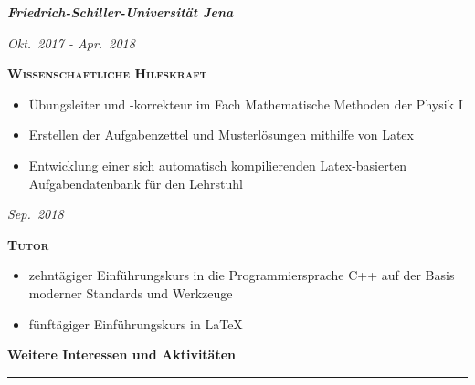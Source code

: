 \documentclass[8pt]{article}
\newcommand{\cvSectionStyle}{%
  \normalfont%
  \Large%
  \color{cvColor}%
  \bfseries%
  \sffamily%
}
\newcommand{\cvSubsectionStyle}{%
  \normalfont%
  \sffamily%
  \itshape%
  \bfseries%
}
\newcommand{\cvTimeStyle}{%
  \normalfont%
  \sffamily%
  \footnotesize%
  \itshape%
}
\newcommand{\cvSection}[1]{%
  \smallskip%
  {%
    \cvSectionStyle #1%
  }\\[-0.5em]
  \rule{\linewidth}{0.8pt}%
  \par%
  \smallskip%
}
\newcommand{\cvSubsection}[1]{%
  \begin{tcolorbox}[left=0pt, top=0pt, bottom=0pt, right=0pt, boxsep=5pt, arc=5pt, frame code={}, colback=cvBackgroundColor]
    \cvSubsectionStyle #1%
  \end{tcolorbox}
}
\newenvironment{cvTimeItem}[2]{
  \par
  \begin{minipage}[c]{0.15\linewidth}
    \raggedleft
    \cvTimeStyle #1
  \end{minipage}
  \quad
  \vrule
  \quad
  \begin{minipage}[t]{0.79\linewidth}
    \sffamily\textsc{\color{cvColor} \textbf{#2}}
    \begin{itemize}[itemsep=0mm, leftmargin=4mm]
      \normalfont\footnotesize\sffamily
}{
    \end{itemize}
  \end{minipage}
  \par%
  \vspace{\baselineskip}%
}
\begin{document}
  \cvSubsection{Friedrich-Schiller-Universität Jena}
  \begin{cvTimeItem}{Okt.~2017 - Apr.~2018}{Wissenschaftliche Hilfskraft}
    \item Übungsleiter und -korrekteur im Fach Mathematische Methoden der Physik I
    \item Erstellen der Aufgabenzettel und Musterlösungen mithilfe von Latex
    \item Entwicklung einer sich automatisch kompilierenden Latex-basierten Aufgabendatenbank für den Lehrstuhl
  \end{cvTimeItem}
  \begin{cvTimeItem}{Sep.~2018}{Tutor}
    \item zehntägiger Einführungskurs in die Programmiersprache C++ auf der Basis moderner Standards und Werkzeuge
    \item fünftägiger Einführungskurs in LaTeX
  \end{cvTimeItem}

  \cvSection{Weitere Interessen und Aktivitäten}
\end{document}
